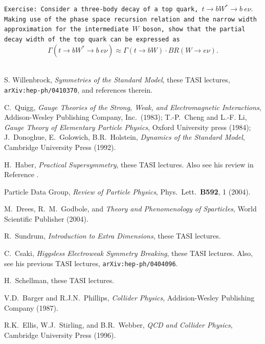 \documentclass[12pt,prd,aps,floats,preprintnumbers,preprint,superscriptaddress,floatfix,nofootinbib]{revtex4}
\def\be{\begin{equation}}
\def\ee{\end{equation}}
\begin{document}
 {
\vskip 0.2cm
\noindent
\tt Exercise: Consider a three-body decay of a top quark, 
$t\to bW^* \to b\ e\nu.$
Making use of the phase space recursion relation and the narrow 
width approximation for the intermediate $W$ boson, show that the
partial decay width of the top quark can be expressed as
\be
\Gamma(t\to b W^* \to b\ e\nu) \approx \Gamma(t\to bW)\cdot BR(W\to e\nu).
\ee
\vskip 0.2cm
}


\begin{thebibliography}{99}

S. Willenbrock, {\it Symmetries of the Standard Model}, 
these TASI lectures, {\tt arXiv:hep-ph/0410370}, and references therein.

C.~Quigg, {\it Gauge Theories of the Strong, 
Weak, and Electromagnetic Interactions}, Addison-Wesley Publishing
Company, Inc.~(1983); 
T.-P.~Cheng and L.-F. Li, {\it Gauge Theory of Elementary
Particle Physics}, Oxford University press (1984);
J.~Donoghue, E.~Golowich, B.R.~Holstein,
{\it Dynamics of the Standard Model}, Cambridge University Press (1992).

H.~Haber, {\it Practical Supersymmetry}, 
these TASI lectures. Also see his review in Reference \cite{PDG}.

 Particle Data Group, {\it Review of Particle  Physics},
Phys.~Lett.~{\bf B592}, 1 (2004).

M.~Drees, R.~M.~Godbole, and  {\it Theory and
Phenomenology of Sparticles}, World Scientific Publisher (2004).

R.~Sundrum, {\it Introduction to Extra Dimensions}, 
these TASI lectures.

C.~Csaki, {\it Higgsless Electroweak 
Symmetry Breaking}, these TASI lectures. Also, see his previous
TASI lectures, {\tt arXiv:hep-ph/0404096}.

H.~Schellman, these TASI lectures.

 V.D.~Barger and R.J.N.~Phillips, {\it Collider Physics}, 
Addision-Wesley Publishing Company (1987).

 R.K.~Ellis, W.J.~Stirling, and B.R.~Webber, 
{\it QCD and Collider Physics}, 
Cambridge University Press (1996).


\end{thebibliography}
\end{document}
